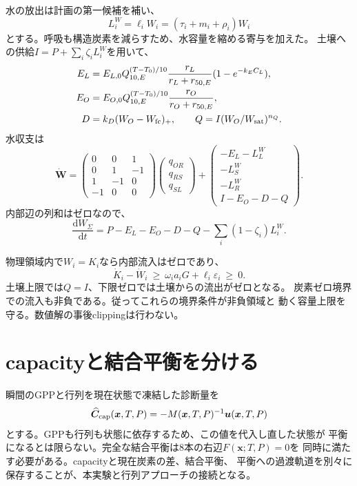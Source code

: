 \documentclass[a4paper,11pt]{ltjsarticle}
\newcommand{\dd}{\mathrm d}
\begin{document}
水の放出は計画の第一候補を補い、
\begin{equation}
L_i^W=\ell_i W_i=(\tau_i+m_i+\rho_i)W_i
\end{equation}
とする。呼吸も構造炭素を減らすため、水容量を縮める寄与を加えた。
土壌への供給$I=P+\sum_i\zeta_iL_i^W$を用いて、
\begin{align}
E_L&=E_{L,0}Q_{10,E}^{(T-T_0)/10}\frac{r_L}{r_L+r_{50,E}}(1-e^{-k_EC_L}),\\
E_O&=E_{O,0}Q_{10,E}^{(T-T_0)/10}\frac{r_O}{r_O+r_{50,E}},\\
D&=k_D(W_O-W_{\rm fc})_+,\qquad
Q=I(W_O/W_{\rm sat})^{n_Q}.
\end{align}
水収支は
\begin{equation}
\dot{\bm W}=
\begin{pmatrix}0&0&1\\0&1&-1\\1&-1&0\\-1&0&0\end{pmatrix}
\begin{pmatrix}q_{OR}\\q_{RS}\\q_{SL}\end{pmatrix}
+\begin{pmatrix}-E_L-L_L^W\\-L_S^W\\-L_R^W\\I-E_O-D-Q\end{pmatrix}.
\end{equation}
内部辺の列和はゼロなので、
\begin{equation}
\frac{\dd W_\Sigma}{\dd t}=P-E_L-E_O-D-Q-\sum_i(1-\zeta_i)L_i^W.
\end{equation}

物理領域内で$W_i=K_i$なら内部流入はゼロであり、
\begin{equation}
\dot K_i-\dot W_i\ \ge\ \omega_i a_iG+\ell_i\varepsilon_i\ \ge\ 0.
\end{equation}
土壌上限では$Q=I$、下限ゼロでは土壌からの流出がゼロとなる。
炭素ゼロ境界での流入も非負である。従ってこれらの境界条件が非負領域と
動く容量上限を守る。数値解の事後clippingは行わない。

\section{capacityと結合平衡を分ける}
瞬間のGPPと行列を現在状態で凍結した診断量を
\begin{equation}
\widehat{\bm C}_{\rm cap}(\bm x,T,P)=-M(\bm x,T,P)^{-1}\bm u(\bm x,T,P)
\end{equation}
とする。GPPも行列も状態に依存するため、この値を代入し直した状態が
平衡になるとは限らない。完全な結合平衡は8本の右辺$F(\bm x;T,P)=0$を
同時に満たす必要がある。capacityと現在炭素の差、結合平衡、
平衡への過渡軌道を別々に保存することが、本実験と行列アプローチの接続となる。
\end{document}
